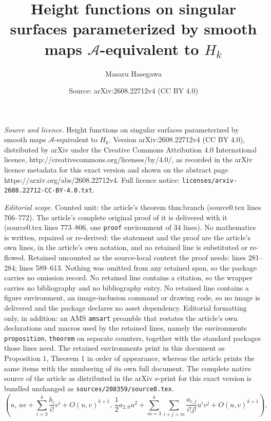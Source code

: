 \documentclass[10pt,a4paper]{amsart}
\title{Height functions on singular surfaces parameterized by smooth maps $\mathcal{A}$-equivalent to $H_k$}
\author{Masaru Hasegawa}
\date{Source: arXiv:2608.22712v4 (CC BY 4.0)}
\begin{document}
\maketitle

\noindent\emph{Source and licence.} Height functions on singular surfaces parameterized by smooth maps $\mathcal{A}$-equivalent to $H_k$. Version arXiv:2608.22712v4 (CC BY 4.0), distributed by arXiv under the Creative Commons Attribution 4.0 International licence, http://creativecommons.org/licenses/by/4.0/, as recorded in the arXiv licence metadata for this exact version and shown on the abstract page https://arxiv.org/abs/2608.22712v4. Full licence notice: \texttt{licenses/arxiv-2608.22712-CC-BY-4.0.txt}.\par\smallskip

\noindent\textit{Editorial scope.} Counted unit: the article's theorem thm:branch (source0.tex lines 766--772). The article's complete original proof of it is delivered with it (source0.tex lines 773--806, one \texttt{proof} environment of 34 lines). No mathematics is written, repaired or re-derived: the statement and the proof are the article's own lines, in the article's own notation, and no retained line is substituted or re-flowed.  Retained uncounted as the source-local context the proof needs: lines 281--284; lines 589--613.  Nothing was omitted from any retained span, so the package carries no omission record.  No retained line contains a citation, so the wrapper carries no bibliography and no bibliography entry.  No retained line contains a figure environment, an image-inclusion command or drawing code, so no image is delivered and the package declares no asset dependency.  Editorial formatting only, in addition: an AMS \texttt{amsart} preamble that restates the article's own declarations and macros used by the retained lines, namely the environments \texttt{proposition}, \texttt{theorem} on separate counters, together with the standard packages those lines need.  The retained environments print in this document as Proposition 1, Theorem 1 in order of appearance, whereas the article prints the same items with the numbering of its own full document.  The complete native source of the article as distributed in the arXiv e-print for this exact version is bundled unchanged as \texttt{sources/208359/source0.tex}.
\begin{equation}
\label{eq:normal_form_2}
\left(u,\, u v + \sum_{i=3}^k \frac{b_i}{i!} v^i + O(u,v)^{k+1},\, \frac12 a_{2,0} u^2 + \sum_{m=3}^k\sum_{i+j=m} \frac{a_{i,j}}{i!j!} u^i v^j + O(u,v)^{k+1}\right), 
\end{equation}
\end{document}
